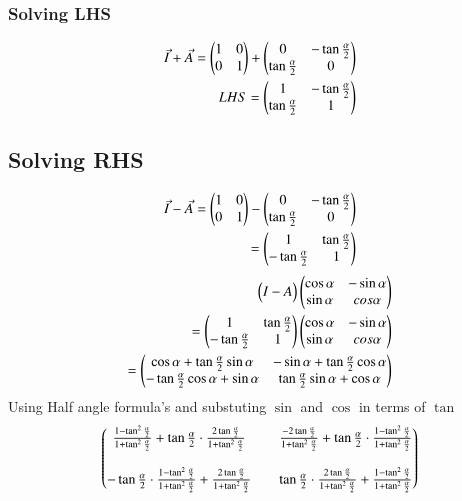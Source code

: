 \documentclass[journal,12pt,onecolumn]{IEEEtran}
\begin{document}
\subsubsection{Solving LHS}
\begin{align}
 \Vec{I}+\Vec{A}=\begin{pmatrix}1 & 0\\ 0 & 1\end{pmatrix}+\begin{pmatrix}0 & - \tan\frac{\alpha}{2} \\ \tan\frac{\alpha}{2} & 0 \end{pmatrix}\\
 LHS=\begin{pmatrix}1 & - \tan\frac{\alpha}{2} \\ \tan\frac{\alpha}{2} & 1 \end{pmatrix}
\end{align}
\subsection{Solving RHS}
\begin{align}
   \Vec{I}-\Vec{A}=\begin{pmatrix}1 & 0\\ 0 & 1\end{pmatrix}-\begin{pmatrix}0 & - \tan\frac{\alpha}{2} \\ \tan\frac{\alpha}{2} & 0 \end{pmatrix}\\
   =\begin{pmatrix}1 &  \tan\frac{\alpha}{2} \\ -\tan\frac{\alpha}{2} & 1 \end{pmatrix}
\end{align}
\begin{align}
 \begin{pmatrix}I-A\end{pmatrix}\begin{pmatrix}\cos\alpha & -\sin\alpha \\ \sin\alpha & cos\alpha\end{pmatrix}\\
 =\begin{pmatrix}1 &  \tan\frac{\alpha}{2} \\ -\tan\frac{\alpha}{2} & 1 \end{pmatrix}\begin{pmatrix}\cos\alpha & -\sin\alpha \\ \sin\alpha & cos\alpha\end{pmatrix}\\
 =\begin{pmatrix}\cos\alpha+\tan\frac{\alpha}{2}\sin\alpha & -\sin\alpha+\tan\frac{\alpha}{2}\cos\alpha \\ -\tan\frac{\alpha}{2}\cos\alpha+\sin\alpha & \tan\frac{\alpha}{2}\sin\alpha+\cos\alpha\end{pmatrix}
\end{align}
Using Half angle formula's and substuting $\sin$ and $\cos$ in terms of $\tan$
\begin{align}
    \begin{pmatrix}\frac{1-\tan^2\frac{\alpha}{2}}{1+\tan^2\frac{\alpha}{2}}+\tan\frac{\alpha}{2}\cdot\frac{2\tan\frac{\alpha}{2}}{1+\tan^2\frac{\alpha}{2}} && \frac{-2\tan\frac{\alpha}{2}}{1+\tan^2\frac{\alpha}{2}}+\tan\frac{\alpha}{2}\cdot\frac{1-\tan^2\frac{\alpha}{2}}{1+\tan^2\frac{\alpha}{2}}\\ \\ -\tan\frac{\alpha}{2}\cdot\frac{1-\tan^2\frac{\alpha}{2}}{1+\tan^2\frac{\alpha}{2} }+\frac{2\tan\frac{\alpha}{2}}{1+\tan^2\frac{\alpha}{2}} && \tan\frac{\alpha}{2}\cdot\frac{2\tan\frac{\alpha}{2}}{1+\tan^2\frac{\alpha}{2}}+\frac{1-\tan^2\frac{\alpha}{2}}{1+\tan^2\frac{\alpha}{2}}\end{pmatrix}
\end{align}
\end{document}
